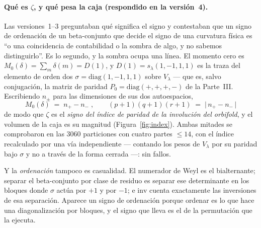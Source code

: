 \documentclass[11pt,a4paper]{article}
\begin{document}
\paragraph{Qu\'e es $\zeta$, y qu\'e pesa la caja (respondido en la versi\'on~4).} Las
versiones~1--3 preguntaban qu\'e significa el signo y contestaban que un signo de ordenaci\'on de
un beta-conjunto que decide el signo de una curvatura f\'isica es ``o una coincidencia de
contabilidad o la sombra de algo, y no sabemos distinguirlo''. Es lo segundo, y la sombra ocupa
una l\'inea. El momento cero es $M_0(\delta)=\sum_m\delta(m)=D(1)$, y $D(1)=s_\lambda(1,-1,1,1)$
es la traza del elemento de orden dos $\sigma=\mathrm{diag}(1,-1,1,1)$ sobre $V_\lambda$ ---
que es, salvo conjugaci\'on, la matriz de paridad $P_0=\mathrm{diag}(+,+,+,-)$ de la Parte~III.
Escribiendo $n_\pm$ para las dimensiones de sus dos autoespacios,
\begin{equation}\label{eq:index}
\boxed{\;M_0(\delta)\;=\;n_+-n_-\;,\qquad
(p{+}1)(q{+}1)(r{+}1)\;=\;\bigl|\,n_+-n_-\,\bigr|\;}
\end{equation}
de modo que $\zeta$ es el \emph{signo del \'indice de paridad de la involuci\'on del orbifold}, y
el volumen de la caja es su magnitud (Figura~\ref{fig:index}). Ambas mitades se comprobaron en las $3060$ particiones con
cuatro partes $\le14$, con el \'indice recalculado por una v\'ia independiente --- contando los
pesos de $V_\lambda$ por su paridad bajo $\sigma$ y no a trav\'es de la forma cerrada ---: sin
fallos.

Y la \emph{ordenaci\'on} tampoco es casualidad. El numerador de Weyl es el bialternante; separar
el beta-conjunto por clase de residuo es separar ese determinante en los bloques donde $\sigma$
act\'ua por $+1$ y por $-1$; e $\mathrm{inv}$ cuenta exactamente las inversiones de esa
separaci\'on. Aparece un signo de ordenaci\'on porque ordenar es lo que hace una
diagonalizaci\'on por bloques, y el signo que lleva es el de la permutaci\'on que la ejecuta.
\end{document}
